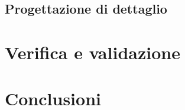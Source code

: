 \documentclass[12pt,a4paper,twoside,openright,english]{book}
\begin{document}
\section{Progettazione di dettaglio}\label{progettazione_dettaglio}

\chapter{Verifica e validazione}\label{verifica_validazione}

\chapter{Conclusioni}\label{conclusioni}

\printglossaries

%




\end{document}

